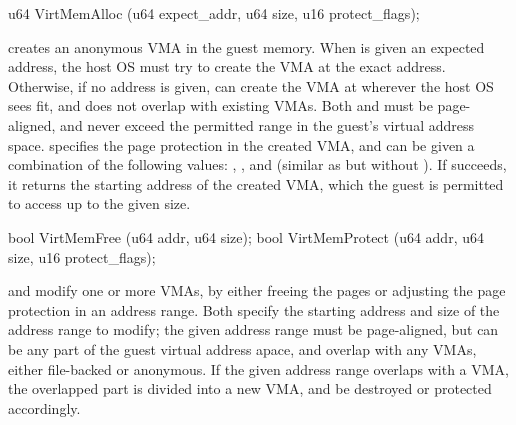 \begin{paldef}
u64  VirtMemAlloc   (u64 expect_addr, u64 size, u16 protect_flags);
\end{paldef}


 creates an anonymous VMA in the guest memory. When  is given an expected address, the host OS must try to create the VMA at the exact address.
Otherwise, if no address is given,  can create the VMA at wherever the host OS sees fit, and does not overlap with existing VMAs.
Both  and 
must be page-aligned, and never exceed the permitted range in the guest's virtual address space.
 specifies the page protection in the created VMA, and can be given a combination of the following values: , , and  (similar as  but without ).
If  succeeds, it returns the starting address
of the created VMA, which the guest is permitted to access up to the given size.





\begin{paldef}
bool VirtMemFree    (u64 addr, u64 size);
bool VirtMemProtect (u64 addr, u64 size, u16 protect_flags);
\end{paldef}


 and  modify one or more VMAs, 
by either freeing the pages
or adjusting the page protection in an address range.
Both \hostapis{} specify the starting address and size of the address range to modify;
the given address range must be page-aligned,
but can be any part of the guest virtual address apace,
and overlap with any VMAs, either file-backed or anonymous.
If the given address range overlaps with a VMA, the overlapped part is divided into a new VMA, and be destroyed or protected accordingly.


 






